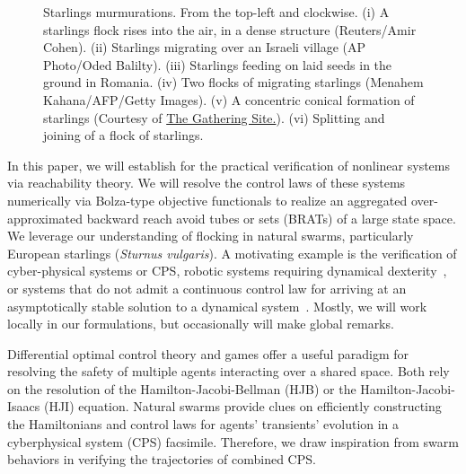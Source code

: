 \begin{figure}[tb!]
\begin{tabular}{ccc}
	\end{tabular}
	\caption{Starlings murmurations. From the top-left and clockwise. (i) A starlings flock rises into the air, in a dense structure (Reuters/Amir Cohen).  (ii) Starlings migrating over an Israeli village (AP Photo/Oded Balilty). (iii) Starlings feeding on laid seeds  in the ground in Romania. (iv) Two flocks of migrating starlings (Menahem Kahana/AFP/Getty Images). (v) A concentric conical formation of starlings (Courtesy of \href{http://www.thegatheringsite.net/qcgems/2014/1/24/murmuration}{The Gathering Site.}). (vi)  Splitting and joining of a flock of starlings.} 
	\label{fig:murmurations}
\end{figure}

In this paper, we will establish  
for the practical verification of nonlinear systems via reachability theory. We will resolve the control laws of these systems numerically via Bolza-type objective functionals to realize an aggregated over-approximated backward reach avoid tubes or sets (BRATs) of a large state space. We leverage our understanding of flocking in natural swarms, particularly European starlings (\textit{Sturnus vulgaris}). A motivating example is the verification of cyber-physical systems or CPS, robotic systems requiring dynamical dexterity~\cite{SeqCompKoditschek}, or  systems that do not admit a continuous control law for arriving at an asymptotically stable solution to a dynamical system~\cite{Brockett83}.  Mostly, we will work locally in our formulations, but occasionally will make global remarks. 


Differential optimal control theory and games offer a useful paradigm for resolving the safety of multiple agents interacting over a shared space. Both rely on the resolution of the Hamilton-Jacobi-Bellman (HJB) or the Hamilton-Jacobi-Isaacs (HJI) equation.  Natural swarms provide clues on efficiently constructing the Hamiltonians and control laws for agents' transients' evolution in a cyberphysical system (CPS) facsimile. Therefore, we draw inspiration from swarm behaviors in verifying the trajectories of combined CPS.


